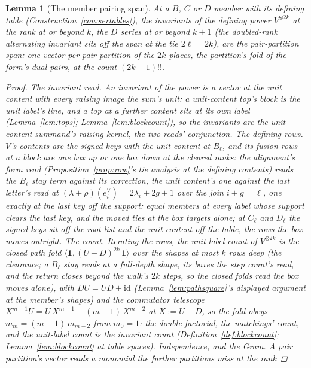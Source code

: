 \documentclass[11pt]{article}
\newtheorem{lemma}{Lemma}
\theoremstyle{definition}
\begin{document}
\begin{lemma}[The member pairing span]\label{lem:serpairing}
At a $B$, $C$ or $D$ member with its defining table
(Construction~\ref{con:sertables}), the invariants of the
defining power $V^{\otimes 2k}$ at the rank at or beyond $k$,
the $D$ series at or beyond $k{+}1$ (the doubled-rank
alternating invariant sits off the span at the tie
$2\ell=2k$), are
the \emph{pair-partition span}: one vector per pair partition of
the $2k$ places, the partition's fold of the form's dual pairs,
at the count $(2k{-}1)!!$.
\begin{proof}
\emph{The invariant read.} An invariant of the power is a vector
at the unit content with every raising image the sum's unit: a
unit-content top's block is the unit label's line, and a top at a
further content sits at its own label (Lemma~\ref{lem:tops};
Lemma~\ref{lem:blockcount}), so the invariants are the
unit-content summand's raising kernel, the two reads'
conjunction.
\emph{The defining rows.} $V$'s contents are the signed keys
with the unit content at $B_\ell$, and its fusion rows at a
block are one box up or one box down at the cleared ranks: the
alignment's form read (Proposition~\ref{prop:row}'s tie
analysis at the defining contents) reads the $B_\ell$ stay term
against its correction, the unit content's one against the last
letter's read at $(\lambda+\rho)(e_i^\vee)=2\lambda_i+2g+1$ over
the join $i+g=\ell$, one exactly at the last key off the
support: equal members at every label whose support clears the
last key, and the moved ties at the box targets alone; at
$C_\ell$ and $D_\ell$ the signed keys sit off the root list and
the unit content off the table, the rows the box moves
outright.
\emph{The count.} Iterating the rows, the unit-label count of
$V^{\otimes 2k}$ is the closed path fold
$\langle\mathbf 1,(U{+}D)^{2k}\,\mathbf 1\rangle$ over the
shapes at most $k$ rows deep (the clearance; a $B_\ell$ stay
reads at a full-depth shape, its boxes the step count's read,
and the return closes beyond the walk's $2k$ steps, so the
closed folds read the box moves alone), with
$DU=UD+\mathrm{id}$ (Lemma~\ref{lem:pathsquare}'s displayed
argument at the member's shapes) and the commutator telescope
$X^{m-1}U=U\,X^{m-1}+(m{-}1)\,X^{m-2}$ at $X:=U{+}D$, so the
fold obeys $m_m=(m{-}1)\,m_{m-2}$ from $m_0=1$: the double
factorial, the matchings' count, and the unit-label count is
the invariant count (Definition~\ref{def:blockcount};
Lemma~\ref{lem:blockcount} at table spaces).
\emph{Independence, and the Gram.} A pair partition's vector
reads a monomial the further partitions miss at the rank

\end{proof}
\end{lemma}
\end{document}
